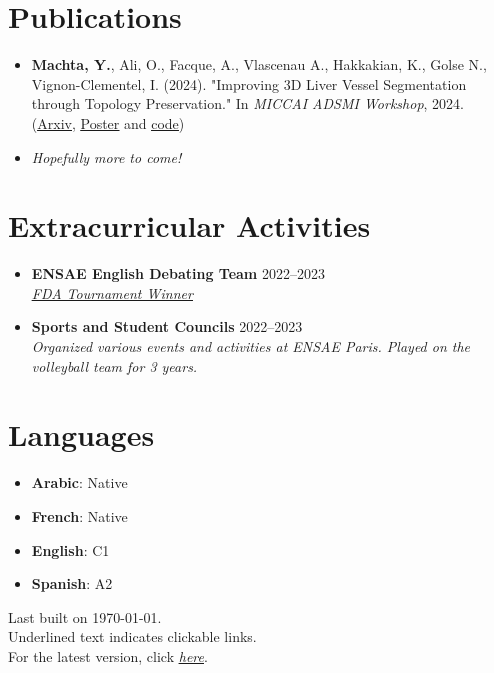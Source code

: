 \documentclass[letterpaper,11pt,twocolumn]{article}
\newcommand{\resumeItem}[1]{\item \small{#1}}
\newcommand{\resumeSubheading}[4]{
	\vspace{-2pt}\item \textbf{#1} \hfill #2 \\
	\textit{\small #3} \hfill \textit{\small #4} 
	\vspace{-7pt}
}
\begin{document}
\section{Publications}
\begin{itemize}[leftmargin=*]
	\resumeItem{\textbf{Machta, Y.}, Ali, O., Facque, A., Vlascenau A., Hakkakian, K., Golse N., Vignon-Clementel, I. (2024). "Improving 3D Liver Vessel Segmentation through Topology Preservation." In \textit{MICCAI ADSMI Workshop}, 2024. (\href{https://arxiv.org/abs/2411.15778}{\underline{Arxiv}}, \href{https://MachtaYassine.github.io/Papers/2024_ADSMI_poster.pdf}{\underline{Poster}} and \underline{\href{https://gitlab.inria.fr/simbiotx/LiverVesselSeg}{code}})}
	\resumeItem{\textit{Hopefully more to come!}}
\end{itemize}

\section{Extracurricular Activities}
\begin{itemize}[leftmargin=*]
	\resumeSubheading
	{ENSAE English Debating Team}{2022--2023}{\href{https://www.frenchdebatingassociation.fr/\#fda}{\underline{FDA Tournament Winner}} }{}
	\resumeSubheading
	{Sports and Student Councils}{2022--2023}{Organized various events and activities at ENSAE Paris. Played on the volleyball team for 3 years.}{}
\end{itemize}

\section{Languages}
\begin{itemize}[leftmargin=*]
	\item \textbf{Arabic}: Native
	\item \textbf{French}: Native
	\item \textbf{English}: C1
	\item \textbf{Spanish}: A2
\end{itemize}

\begin{flushright}
	\vspace{-4pt}
	\color{gray}
	Last built on \today.  \\
	Underlined text indicates clickable links. \\
	For the latest version, click \href{https://machtayassine.github.io/resume/resume_ymachta.pdf}{\underline{\textit{here}}}.
\end{flushright}
\end{document}
